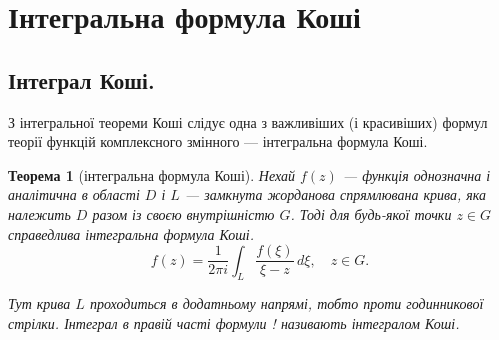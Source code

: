 \documentclass[12pt,fleqn]{article}
\theoremstyle{theorem}
\newtheorem{thm}{Теорема}[section]
\theoremstyle{proof}
\numberwithin{figure}{section}
\numberwithin{equation}{section}
\begin{document}
\newpage

\section{Інтегральна формула Коші}\label{int}\allowdisplaybreaks

\subsection{Інтеграл Коші.}
З інтегральної теореми Коші слідує одна з важливіших (і красивіших) формул теорії функцій комплексного змінного --- інтегральна формула Коші.
\begin{thm}[інтегральна формула Коші]
Нехай $f(z)$ --- функція однозначна і аналітична в області $D$ і $L$ --- замкнута жорданова спрямлювана крива, яка належить $D$ разом із своєю внутрішністю $G$. Тоді для будь-якої точки $z\in G$ справедлива інтегральна формула Коші.
\begin{equation}\label{xy}
f(z)=\frac{1}{2\pi i}\int_{L}\frac{f(\xi)}{\xi - z}\,d\xi, \quad z\in G.
\end{equation}

Тут крива $L$ проходиться в додатньому напрямі, тобто проти годинникової стрілки. Інтеграл в правій часті формули ! називають інтегралом Коші.
\end{thm}
\end{document}
